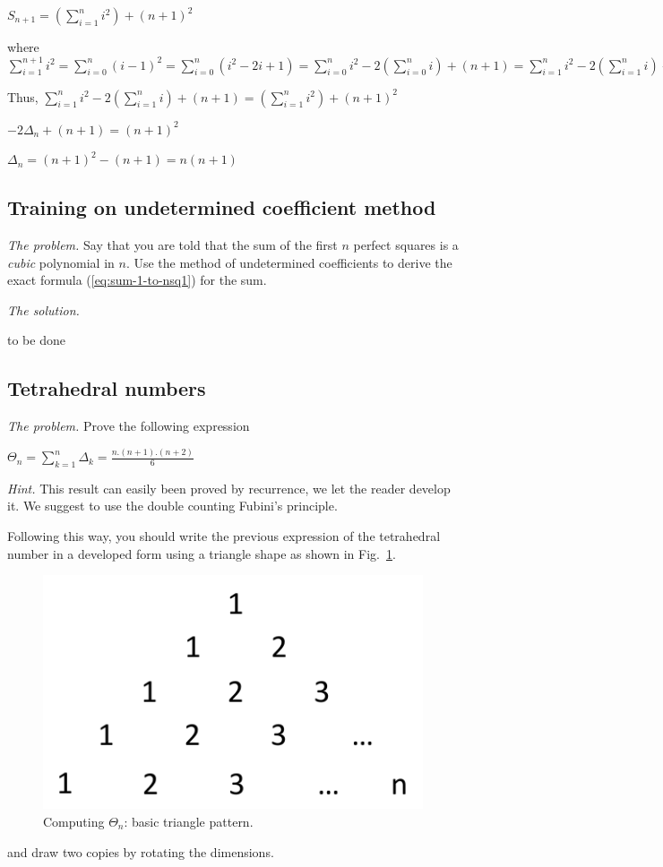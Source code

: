$S_{n+1} = (\sum_{i=1}^{n} i^2) + (n+1)^2$

where $\sum_{i=1}^{n+1} i^2 
= \sum_{i=0}^{n} (i-1)^2 
= \sum_{i=0}^{n} (i^2-2i+1) 
= \sum_{i=0}^{n} i^2- 2 ( \sum_{i=0}^{n} i) + (n+1)
= \sum_{i=1}^{n} i^2- 2 ( \sum_{i=1}^{n} i) + (n+1)$

Thus, 
$\sum_{i=1}^{n} i^2- 2 ( \sum_{i=1}^{n} i) + (n+1) = (\sum_{i=1}^{n} i^2) + (n+1)^2$

$-2 \Delta_n + (n+1) =  (n+1)^2$

$\Delta_n =  (n+1)^2-(n+1) = n(n+1)$

\subsection{Training on undetermined coefficient method}

\noindent \textit{The problem.}
Say that you are told that the sum of the first $n$ perfect squares is
a {\em cubic} polynomial in $n$.  Use the method of undetermined
coefficients to derive the exact formula (\ref{eq:sum-1-to-nsq1}) for
the sum.
\medskip

\noindent \textit{The solution.}

to be done


\subsection{Tetrahedral numbers}


\noindent \textit{The problem.}
Prove the following expression

$\Theta_n =  \sum_{k=1}^{n} \Delta_k = \frac{n.(n+1).(n+2)}{6}$
\medskip

\noindent \textit{Hint.}
This result can easily been proved by recurrence, we let the reader develop it. 
We suggest to use the double counting Fubini's principle.

Following this way, you should write the previous expression of the tetrahedral number in a developed form 
using a triangle shape as shown in Fig.~\ref{fig:TetrahedralBasic}.
\begin{figure}[h]
\begin{center}
        \includegraphics[scale=0.5]{FiguresArithmetic/TetrahedralBasic}
        \caption{Computing $\Theta_n$: basic triangle pattern.}
        \label{fig:TetrahedralBasic}
\end{center}
\end{figure}
and draw two copies by rotating the dimensions.

